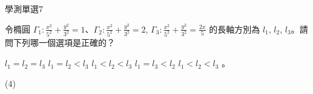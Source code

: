     \begin{QUESTION}
        \begin{ExamInfo}{99}{學測}{單選}{7}
        \end{ExamInfo}
        \begin{ExamAnsRateInfo}{33}{65}{22}{12}
        \end{ExamAnsRateInfo}
        \begin{QBODY}
            令橢圓 $\Gamma_1 : \frac{x^2}{5^2} + \frac{y^2}{3^2} =1$、$\Gamma_2 : \frac{x^2}{5^2} + \frac{y^2}{3^2} =2$, $\Gamma_3 : \frac{x^2}{5^2} + \frac{y^2}{3^2} =\frac{2x}{5}$ 的長軸方別為 $l_1$, $l_2$, $l_3$。請問下列哪一個選項是正確的？
			\begin{QOPS} 
				\QOP $l_1=l_2=l_3$ 
				\QOP $l_1=l_2<l_3$
				\QOP $l_1<l_2<l_3$ 
				\QOP $l_1=l_3<l_2$ 
				\QOP $l_1<l_2<l_3$ 。
			\end{QOPS}
        \end{QBODY}
        \begin{QFROMS}
        \end{QFROMS}
        \begin{QTAGS}\end{QTAGS}
        \begin{QANS}
            (4)
        \end{QANS}
        \begin{QSOLLIST}
        \end{QSOLLIST}
        \begin{QEMPTYSPACE}
        \end{QEMPTYSPACE}
    \end{QUESTION}
